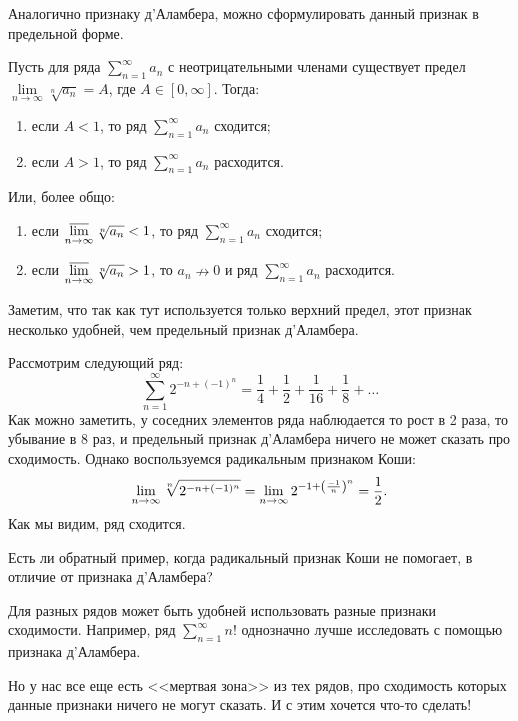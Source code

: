 \documentclass[a4paper, 12pt]{article}
\begin{document}
Аналогично признаку д'Аламбера, можно сформулировать данный признак в предельной форме.
\begin{Consequence}
	Пусть для ряда	 $\sum\limits_{n=1}^{\infty} a_n$ с неотрицательными членами существует предел $\lim\limits_{n\rightarrow\infty} \sqrt[n]{a_n} = A$, где $A \in [0, \infty]$. Тогда:
	\begin{enumerate}
		\item если $A < 1$, то ряд $\sum\limits_{n=1}^{\infty} a_n$ сходится;
		\item если $A > 1$, то ряд $\sum\limits_{n=1}^{\infty} a_n$ расходится.
	\end{enumerate}
	Или, более общо:
	\begin{enumerate}
	\item если $\varlimsup\limits_{n\rightarrow \infty} \sqrt[n]{a_n} < 1$, то ряд $\sum\limits_{n=1}^{\infty} a_n$ сходится;
	\item если $\varlimsup\limits_{n\rightarrow \infty} \sqrt[n]{a_n} > 1$, то $a_n \nrightarrow 0$ и ряд $\sum\limits_{n=1}^{\infty} a_n$ расходится.
	\end{enumerate}
\end{Consequence}
Заметим, что так как тут используется только верхний предел, этот признак несколько удобней, чем предельный признак д'Аламбера.

\begin{Examples}
Рассмотрим следующий ряд:
$$
\sum\limits_{n=1}^{\infty} 2^{-n+(-1)^n} = \frac{1}{4} + \frac{1}{2} + \frac{1}{16} + \frac{1}{8} + \ldots 
$$
Как можно заметить, у соседних элементов ряда наблюдается то рост в 2 раза, то убывание в 8 раз, и предельный признак д'Аламбера ничего не может сказать про сходимость. Однако воспользуемся радикальным признаком Коши:
$$
\lim_{n\rightarrow \infty} \sqrt[n]{2^{-n + (-1)^n}} = \lim_{n\rightarrow \infty} 2^{-1 + \left(\frac{-1}{n}\right)^n} = \frac{1}{2}.
$$
Как мы видим, ряд сходится.
\end{Examples}

\begin{Task}
Есть ли обратный пример, когда радикальный признак Коши не помогает, в отличие от признака д'Аламбера?
\end{Task}

Для разных рядов может быть удобней использовать разные признаки сходимости. Например, ряд $\sum\limits_{n=1}^{\infty} n!$ однозначно лучше исследовать с помощью признака д'Аламбера.

Но у нас все еще есть <<мертвая зона>> из тех рядов, про сходимость которых данные признаки ничего не могут сказать. И с этим хочется что-то сделать! 
\end{document}
